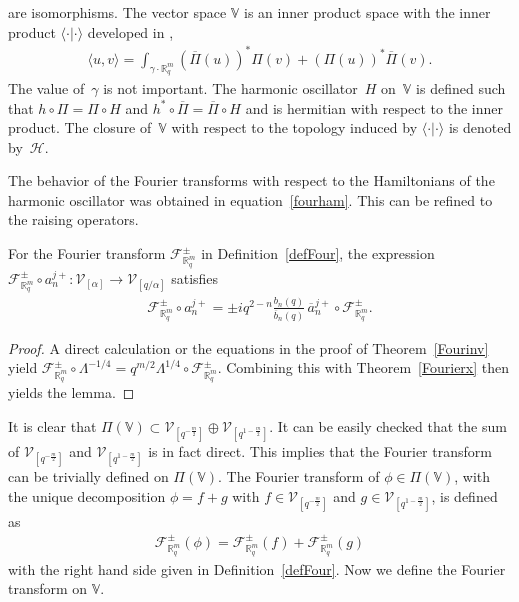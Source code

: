 \documentclass[pdftex]{sigma}
\newcommand{\mR}{\mathbb{R}}
\newcommand{\mV}{\mathbb{V}}
\newcommand{\cH}{\mathcal{H}}
\newcommand{\cF}{\mathcal{F}}
\newcommand{\cV}{\mathcal{V}}
\numberwithin{equation}{section}
\begin{document}
are isomorphisms. The vector space $\mV$ is an inner product space with the inner product $\langle\cdot|\cdot\rangle$ developed in \cite{MR1239953},
\begin{gather}
\label{inFiore}
\langle u,v\rangle = \int_{\gamma\cdot\mR^m_q}\left(\overline{\Pi}(u)\right)^\ast \Pi(v)+\left({\Pi}(u)\right)^\ast \overline{\Pi}(v).
\end{gather}
The value of~$\gamma$ is not important. The harmonic oscillator~$H$ on~$\mV$ is def\/ined such that $h\circ \Pi=\Pi\circ H$ and $h^\ast\circ \overline{\Pi}=\overline{\Pi}\circ H$ and is hermitian with respect to the inner product. The closure of~$\mV$ with respect to the topology induced by $\langle\cdot|\cdot\rangle$ is denoted by~$\cH$.



The behavior of the Fourier transforms with respect to the Hamiltonians of the harmonic oscillator was obtained in equation~\eqref{fourham}. This can be ref\/ined to the raising operators.
\begin{lemma}
\label{Foura}
For the Fourier transform $\cF^\pm_{\mR^m_q}$ in Definition~{\rm \ref{defFour}}, the expression $\cF^\pm_{\mR^m_q}\circ a^{j+}_n:\cV_{[\alpha]}\to\cV_{[q/\alpha]}$ satisfies
\begin{gather*}
\cF^\pm_{\mR^m_q}\circ a^{j+}_n = \pm iq^{2-n}\frac{b_n(q)}{\overline{b}_n(q)}\, \overline{a}^{j+}_n \circ \cF^\pm_{\mR^m_q}.
\end{gather*}
\end{lemma}

\begin{proof}
A direct calculation or the equations in the proof of Theorem~\ref{Fourinv} yield $\cF^\pm_{\mR^m_q}\circ\Lambda^{-1/4} =q^{m/2}\Lambda^{1/4}\circ \cF^\pm_{\mR^m_q}$. Combining this with Theorem~\ref{Fourierx} then yields the lemma.
\end{proof}

It is clear that $\Pi(\mV)\subset \cV_{[q^{-\frac{m}{2}}]}\oplus\cV_{[q^{1-\frac{m}{2}}]}$. It can be easily checked that the sum of $\cV_{[q^{-\frac{m}{2}}]}$ and $\cV_{[q^{1-\frac{m}{2}}]}$ is in fact direct. This implies that the Fourier transform can be trivially def\/ined on $\Pi(\mV)$. The Fourier transform of $\phi\in\Pi(\mV)$, with the unique decomposition $\phi=f+g$ with $f\in\cV_{[q^{-\frac{m}{2}}]}$ and $g\in\cV_{[q^{1-\frac{m}{2}}]}$, is def\/ined as
\begin{gather}
\label{defFourtss}
\cF^\pm_{\mR^m_q}(\phi) = \cF^\pm_{\mR^m_q}(f)+\cF^\pm_{\mR^m_q}(g)
\end{gather}
with the right hand side given in Def\/inition~\ref{defFour}. Now we def\/ine the Fourier transform on $\mV$.
\end{document}
